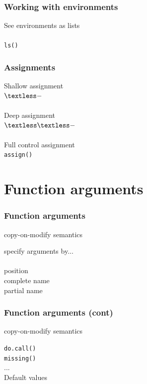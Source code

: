 \documentclass{beamer}
\begin{document}
\begin{frame}
	\frametitle{Working with environments}
	\begin{center}	
		See environments as lists \\~\\
		\texttt{ls()}
	\end{center}
\end{frame}

\begin{frame}
	\frametitle{Assignments}
	\begin{center}
		Shallow assignment \\
		$\textless-$ \\~\\
		Deep assignment \\
		$\textless\textless-$ \\~\\
		Full control assignment \\
		\texttt{assign()} \\
	\end{center}
\end{frame}

\section{Function arguments}

\begin{frame}
	\frametitle{Function arguments}
	\centerline{copy-on-modify semantics}
	\begin{center}
		specify arguments by... \\~\\
		position \\
		complete name \\
		partial name \\
	\end{center}
\end{frame}


\begin{frame}
	\frametitle{Function arguments (cont)}
	\centerline{copy-on-modify semantics}
	\begin{center}
		\texttt{do.call()} \\
		\texttt{missing()} \\
		... \\
		Default values \\
	\end{center}
\end{frame}
\end{document}
